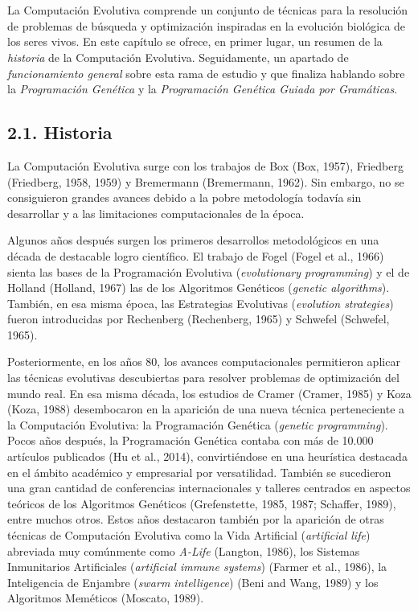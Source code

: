\documentclass[spanish,a4paper,12pt,twoside]{report}
\begin{document}
  \chapter{\vspace{-3cm}{\LARGE 2. Computación Evolutiva}}
  \vspace{-1cm}
  La Computación Evolutiva comprende un conjunto de técnicas para la resolución de problemas de búsqueda y optimización inspiradas en la evolución biológica de los seres vivos. En este capítulo se ofrece, en primer lugar, un resumen de la \emph{historia} de la Computación Evolutiva. Seguidamente, un apartado de \emph{funcionamiento general} sobre esta rama de estudio y que finaliza hablando sobre la \emph{Programación Genética} y la \emph{Programación Genética Guiada por Gramáticas}.
  \section*{\Large 2.1. Historia}
  La Computación Evolutiva surge con los trabajos de Box (Box, 1957),  Friedberg (Friedberg, 1958, 1959) y Bremermann (Bremermann, 1962). Sin embargo, no se consiguieron grandes avances debido a la pobre metodología todavía sin desarrollar y a las limitaciones computacionales de la época. \par
  Algunos años después surgen los primeros desarrollos metodológicos en una década de destacable logro científico. El trabajo de Fogel (Fogel et al., 1966) sienta las bases de la Programación Evolutiva (\emph{evolutionary programming}) y el de Holland (Holland, 1967) las de los Algoritmos Genéticos (\emph{genetic algorithms}). También, en esa misma época, las Estrategias Evolutivas (\emph{evolution strategies}) fueron introducidas por Rechenberg (Rechenberg, 1965) y Schwefel (Schwefel, 1965). \par
  Posteriormente, en los años 80, los avances computacionales permitieron aplicar las técnicas evolutivas descubiertas para resolver problemas de optimización del mundo real. En esa misma década, los estudios de Cramer (Cramer, 1985) y Koza (Koza, 1988) desembocaron en la aparición de una nueva técnica perteneciente a la Computación Evolutiva: la Programación Genética (\emph{genetic programming}). Pocos años después, la Programación Genética contaba con más de 10.000 artículos publicados (Hu et al., 2014), convirtiéndose en una heurística destacada en el ámbito académico y empresarial por versatilidad. También se sucedieron una gran cantidad de conferencias internacionales y talleres centrados en aspectos teóricos de los Algoritmos Genéticos (Grefenstette, 1985, 1987; Schaffer, 1989), entre muchos otros. Estos años destacaron también por la aparición de otras técnicas de Computación Evolutiva como la Vida Artificial (\emph{artificial life}) abreviada muy comúnmente como \emph{A-Life} (Langton, 1986), los Sistemas Inmunitarios Artificiales (\emph{artificial immune systems}) (Farmer et al., 1986), la Inteligencia de Enjambre (\emph{swarm intelligence}) (Beni and Wang, 1989) y los Algoritmos Meméticos (Moscato, 1989). \par
\end{document}
